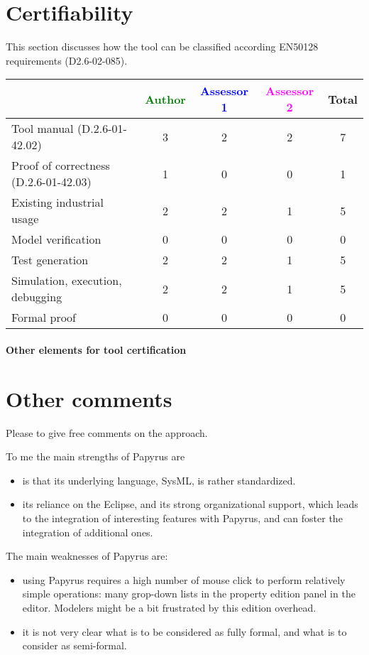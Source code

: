 \section{Certifiability}

This section discusses how the tool can be classified according EN50128 requirements (D2.6-02-085).


\begin{tabular}{|l | c | c | c | c|}
\hline
& \textcolor{green}{Author} & \textcolor{blue}{Assessor 1} & \textcolor{magenta}{Assessor 2} & Total \\
\hline
Tool manual (D.2.6-01-42.02) & 3 & 2 & 2 & 7 \\
\hline
Proof of correctness (D.2.6-01-42.03) & 1 & 0 & 0  & 1 \\
\hline
Existing industrial usage & 2 & 2 & 1 & 5 \\
\hline
Model verification & 0 & 0 & 0 & 0 \\
\hline
Test generation & 2 & 2 & 1 & 5 \\
\hline
Simulation, execution, debugging & 2 & 2 & 1 & 5 \\
\hline
Formal proof & 0 & 0 & 0 & 0 \\
\hline
\end{tabular}

\paragraph{Other elements for tool certification}

\section{Other comments}
Please to give free comments on the approach.

\begin{assessor1}
To me the main strengths of Papyrus are
\begin{itemize}
\item is that its underlying language, SysML, is rather standardized. 
\item its reliance on the Eclipse, and its strong organizational support, which leads to the integration of interesting features with Papyrus, and can foster the integration of additional ones. 
\end{itemize}

The main weaknesses of Papyrus are: 
\begin{itemize}
\item using Papyrus requires a high number of mouse click to perform relatively simple operations: many grop-down lists in the property edition panel in the editor. Modelers might be a bit frustrated by this edition overhead. 
\item it is not very clear what is to be considered as fully formal, and what is to consider as semi-formal.  
\end{itemize}
\end{assessor1}

